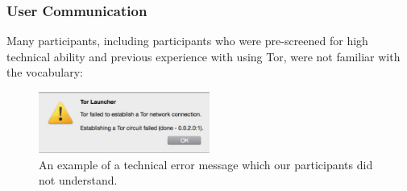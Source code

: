 \documentclass[USenglish,oneside,twocolumn]{article}
\begin{document}

\subsubsection{User Communication} 
Many participants, including participants who were pre-screened for high technical ability and previous experience with using Tor, were not familiar with the vocabulary:

\begin{figure}[t]
  \centering
    \includegraphics[width=0.5\textwidth]{error.png}
    \caption{An example of a technical error message which our participants did not understand.}
\label{fig:error}
\end{figure}
\end{document}
